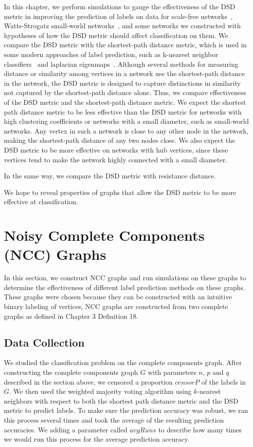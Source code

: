 In this chapter, we perform simulations to gauge the effectiveness of the
DSD metric in improving the prediction of labels on data for scale-free
networks~\cite{PhysRevLett.90.058701}, Watts-Strogatz small-world
networks~\cite{Watts1998Collective}, and some networks we constructed with
hypotheses of how the DSD metric should affect classification on them. We 
compare the DSD metric with the shortest-path distance metric, which is 
used in some modern approaches of label prediction, such as k-nearest 
neighbor classifiers~\cite{10.1371/journal.pone.0076339} and laplacian 
eigenmaps~\cite{belkin2002laplacian}. Although several methods for 
measuring distance or similarity among vertices in a network use the 
shortest-path distance in the network, the DSD metric is designed to 
capture distinctions in similarity not captured by the shortest-path 
distance alone. Thus, we compare effectiveness of the DSD metric and the 
shortest-path distance metric. We expect the shortest path distance metric 
to be less effective than the DSD metric for networks with high clustering 
coefficients or networks with a small diameter, such as small-world 
networks. Any vertex in such a network is close to any other node in the 
network, making the shortest-path distance of any two nodes close. We also 
expect the DSD metric to be more effective on networks with hub vertices, 
since these vertices tend to make the network highly connected with a small 
diameter.

In the same way, we compare the DSD metric with resistance distance.

We hope to reveal properties of graphs that allow the DSD metric to be more 
effective at classification.


\section{Noisy Complete Components (NCC) Graphs}
In this section, we construct NCC graphs and run simulations on these 
graphs to determine the effectiveness of different label prediction methods 
on these graphs. These graphs were chosen because they can be constructed 
with an intuitive binary labeling of vertices; NCC graphs are constructed 
from two complete graphs as defined in Chapter 3 Definition 18.

\subsection{Data Collection}
We studied the classification problem on the complete components graph. After constructing the complete components graph $G$ with parameters $n$, $p$ and $q$ described in the section above, we censored a proportion $censorP$ of the labels in $G$. We then used the weighted majority voting algorithm using $k$-nearest neighbors with respect to both the shortest path distance metric and the DSD metric to predict labels. To make sure the prediction accuracy was robust, we ran this process several times and took the average of the resulting prediction accuracies. We adding a parameter called $avgRuns$ to describe how many times we would run this process for the average prediction accuracy.

